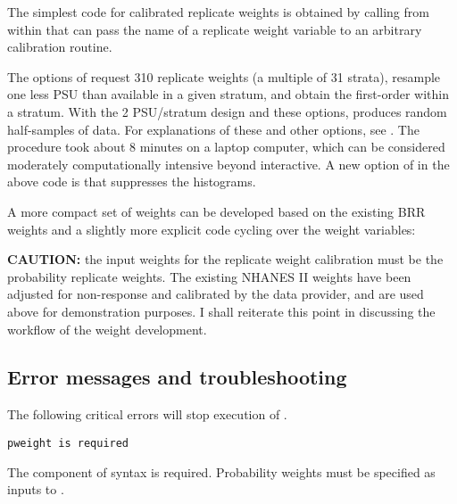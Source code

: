 \begin{stexample}[Example 6]

The simplest code for calibrated replicate weights is obtained by calling
 from within  \citep{kolenikov:2010}
that can pass the name of a replicate weight variable to an arbitrary
calibration routine.

\begin{stlog}
\nullskip
\end{stlog}

The options of  request 310 replicate weights
(a multiple of 31 strata), resample one less PSU than available in
a given stratum, and obtain the first-order within a stratum.
With the 2 PSU/stratum design and these options, 
produces random half-samples of data.
For explanations of these and other options,
see \citet{kolenikov:2010}. The procedure took about 8 minutes
on a laptop computer, which can be considered moderately
computationally intensive beyond interactive.
A new option of  in the above code is
 that suppresses the histograms.

A more compact set of weights can be developed based on the existing
BRR weights and a slightly more explicit code cycling over the weight
variables:

\begin{stlog}
\nullskip
\end{stlog}

\end{stexample}

{\bf CAUTION:} the input weights for the replicate weight calibration
must be the probability replicate weights. The existing NHANES II weights
have been adjusted for non-response and calibrated by the data provider,
and are used above for demonstration purposes. I shall reiterate this
point in discussing the workflow of the weight development.

\subsection{Error messages and troubleshooting}

The following critical errors will stop execution of
.

\noindent
{\tt pweight is required}

\morehang
    The \stcmd{[pweight=\ldots]} component of 
    syntax is required. Probability weights must be specified as
    inputs to .

